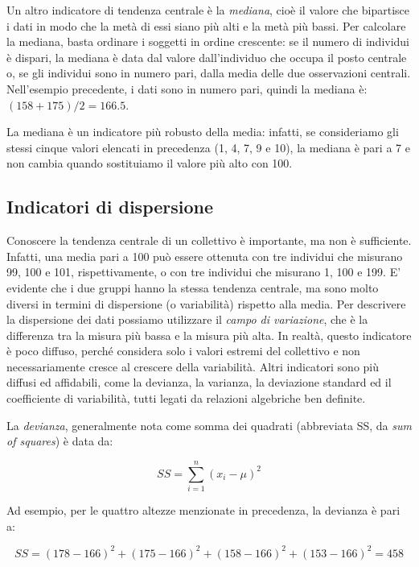 \documentclass[a4paper,12pt,oneside]{book}
\begin{document}
Un altro indicatore di tendenza centrale è la \emph{mediana}, cioè il valore che bipartisce i dati in modo che la metà di essi siano più alti e la metà più bassi. Per calcolare la mediana, basta ordinare i soggetti in ordine crescente: se il numero di individui è dispari, la mediana è data dal valore dall'individuo che occupa il posto centrale o, se gli individui sono in numero pari, dalla media delle due osservazioni centrali. Nell'esempio precedente, i dati sono in numero pari, quindi la mediana è: \((158 + 175)/2 = 166.5\).

La mediana è un indicatore più robusto della media: infatti, se consideriamo gli stessi cinque valori elencati in precedenza (1, 4, 7, 9 e 10), la mediana è pari a 7 e non cambia quando sostituiamo il valore più alto con 100.

\hypertarget{indicatori-di-dispersione}{%
\subsection{Indicatori di dispersione}\label{indicatori-di-dispersione}}

Conoscere la tendenza centrale di un collettivo è importante, ma non è sufficiente. Infatti, una media pari a 100 può essere ottenuta con tre individui che misurano 99, 100 e 101, rispettivamente, o con tre individui che misurano 1, 100 e 199. E' evidente che i due gruppi hanno la stessa tendenza centrale, ma sono molto diversi in termini di dispersione (o variabilità) rispetto alla media. Per descrivere la dispersione dei dati possiamo utilizzare il \emph{campo di variazione}, che è la differenza tra la misura più bassa e la misura più alta. In realtà, questo indicatore è poco diffuso, perché considera solo i valori estremi del collettivo e non necessariamente cresce al crescere della variabilità. Altri indicatori sono più diffusi ed affidabili, come la devianza, la varianza, la deviazione standard ed il coefficiente di variabilità, tutti legati da relazioni algebriche ben definite.

La \emph{devianza}, generalmente nota come somma dei quadrati (abbreviata SS, da \emph{sum of squares}) è data da:

\[SS = \sum\limits_{i = 1}^n {(x_i  - \mu)^2 }\]

Ad esempio, per le quattro altezze menzionate in precedenza, la devianza è pari a:

\[SS = \left(178 - 166 \right)^2 + \left(175 - 166 \right)^2 + \left(158 - 166 \right)^2  + \left(153 - 166 \right)^2 = 458\]
\end{document}
